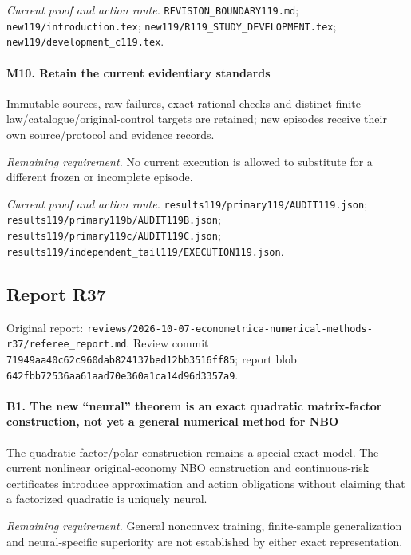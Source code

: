 \par\emph{Current proof and action route.} \nolinkurl{REVISION_BOUNDARY119.md}; \nolinkurl{new119/introduction.tex}; \nolinkurl{new119/R119_STUDY_DEVELOPMENT.tex}; \nolinkurl{new119/development_c119.tex}.

\paragraph{M10. Retain the current evidentiary standards}

Immutable sources, raw failures, exact-rational checks and distinct finite-law/\allowbreak{}catalogue/\allowbreak{}original-control targets are retained; new episodes receive their own source/\allowbreak{}protocol and evidence records.

\par\emph{Remaining requirement.} No current execution is allowed to substitute for a different frozen or incomplete episode.

\par\emph{Current proof and action route.} \nolinkurl{results119/primary119/AUDIT119.json}; \nolinkurl{results119/primary119b/AUDIT119B.json}; \nolinkurl{results119/primary119c/AUDIT119C.json}; \nolinkurl{results119/independent_tail119/EXECUTION119.json}.

\subsection{Report R37}

Original report: \nolinkurl{reviews/2026-10-07-econometrica-numerical-methods-r37/referee_report.md}. Review commit \nolinkurl{71949aa40c62c960dab824137bed12bb3516ff85}; report blob \nolinkurl{642fbb72536aa61aad70e360a1ca14d96d3357a9}.

\paragraph{B1. The new “neural” theorem is an exact quadratic matrix-factor construction, not yet a general numerical method for NBO}

The quadratic-factor/\allowbreak{}polar construction remains a special exact model. The current nonlinear original-economy NBO construction and continuous-risk certificates introduce approximation and action obligations without claiming that a factorized quadratic is uniquely neural.

\par\emph{Remaining requirement.} General nonconvex training, finite-sample generalization and neural-specific superiority are not established by either exact representation.

